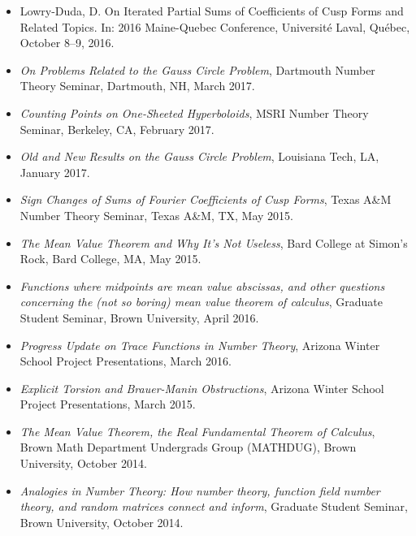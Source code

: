 \begin{itemize}

    \item Lowry-Duda, D.
      On Iterated Partial Sums of Coefficients of Cusp Forms and Related Topics.
      In: 2016 Maine-Quebec Conference,
      Universit\'{e} Laval, Qu\'{e}bec,
      October 8--9, 2016.

    \item \emph{On Problems Related to the Gauss Circle Problem},
      Dartmouth Number Theory Seminar,
      Dartmouth, NH,
      March 2017.

    \item \emph{Counting Points on One-Sheeted Hyperboloids},
      MSRI Number Theory Seminar,
      Berkeley, CA,
      February 2017.

    \item \emph{Old and New Results on the Gauss Circle Problem},
      Louisiana Tech, LA,
      January 2017.

    \item \emph{Sign Changes of Sums of Fourier Coefficients of Cusp Forms},
      Texas A\&M Number Theory Seminar,
      Texas A\&M, TX,
      May 2015.

    \item \emph{The Mean Value Theorem and Why It's Not Useless},
      Bard College at Simon's Rock,
      Bard College, MA,
      May 2015.

    \item \emph{Functions where midpoints are mean value abscissas, and other questions
      concerning the (not so boring) mean value theorem of calculus},
      Graduate Student Seminar,
      Brown University,
      April 2016.

    \item \emph{Progress Update on Trace Functions in Number Theory},
      Arizona Winter School Project Presentations,
      March 2016.

    \item \emph{Explicit Torsion and Brauer-Manin Obstructions},
      Arizona Winter School Project Presentations,
      March 2015.

    \item \emph{The Mean Value Theorem, the Real Fundamental Theorem of Calculus},
      Brown Math Department Undergrads Group (MATHDUG),
      Brown University,
      October 2014.

    \item \emph{Analogies in Number Theory: How number theory, function field number
      theory, and random matrices connect and inform},
      Graduate Student Seminar,
      Brown University,
      October 2014.


\end{itemize}
